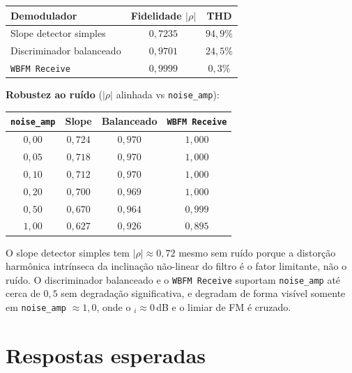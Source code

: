 \documentclass[11pt,a4paper]{article}
\begin{document}
\begin{tabular}{l c c}
  \toprule
  Demodulador & Fidelidade $|\rho|$ & THD \\
  \midrule
  Slope detector simples         & $0{,}7235$ & $94{,}9\%$ \\
  Discriminador balanceado       & $0{,}9701$ & $24{,}5\%$ \\
  \texttt{WBFM Receive}          & $0{,}9999$ & $0{,}3\%$ \\
  \bottomrule
\end{tabular}

\textbf{Robustez ao ruído} ($|\rho|$ alinhada vs \texttt{noise\_amp}):

\begin{tabular}{c c c c}
  \toprule
  \texttt{noise\_amp} & Slope & Balanceado & \texttt{WBFM Receive} \\
  \midrule
  $0{,}00$ & $0{,}724$ & $0{,}970$ & $1{,}000$ \\
  $0{,}05$ & $0{,}718$ & $0{,}970$ & $1{,}000$ \\
  $0{,}10$ & $0{,}712$ & $0{,}970$ & $1{,}000$ \\
  $0{,}20$ & $0{,}700$ & $0{,}969$ & $1{,}000$ \\
  $0{,}50$ & $0{,}670$ & $0{,}964$ & $0{,}999$ \\
  $1{,}00$ & $0{,}627$ & $0{,}926$ & $0{,}895$ \\
  \bottomrule
\end{tabular}

\begin{nota}
O slope detector simples tem $|\rho| \approx 0{,}72$ mesmo sem ruído porque
a distorção harmônica intrínseca da inclinação não-linear do filtro é o
fator limitante, não o ruído. O discriminador balanceado e o
\texttt{WBFM Receive} suportam \texttt{noise\_amp} até cerca de $0{,}5$
sem degradação significativa, e degradam de forma visível somente em
\texttt{noise\_amp} $\approx 1{,}0$, onde o $_i \approx 0$\,dB e o
limiar de FM é cruzado.
\end{nota}

\section*{Respostas esperadas}
\end{document}

